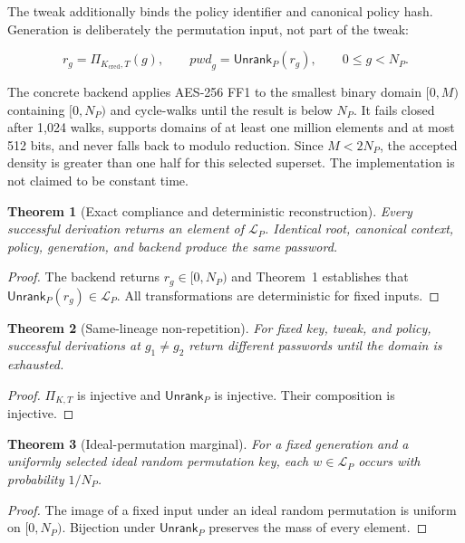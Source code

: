 \documentclass[preprint,12pt]{elsarticle}
\newcommand{\Lang}{\mathcal{L}}
\newcommand{\Unrank}{\mathsf{Unrank}}
\newcommand{\Perm}{\Pi}
\newtheorem{theorem}{Theorem}
\begin{document}
The tweak additionally binds the policy identifier and canonical policy hash.
Generation is deliberately the permutation input, not part of the tweak:

\[
 r_g=\Perm_{K_{\mathrm{cred}},T}(g),\qquad
 \mathit{pwd}_g=\Unrank_P(r_g),\qquad 0\le g<N_P.
\]

The concrete backend applies AES-256 FF1 to the smallest binary domain
$[0,M)$ containing $[0,N_P)$ and cycle-walks until the result is below $N_P$.
It fails closed after 1,024 walks, supports domains of at least one million
elements and at most 512 bits, and never falls back to modulo reduction. Since
$M<2N_P$, the accepted density is greater than one half for this selected
superset. The implementation is not claimed to be constant time.

\begin{theorem}[Exact compliance and deterministic reconstruction]
Every successful derivation returns an element of $\Lang_P$. Identical root,
canonical context, policy, generation, and backend produce the same password.
\end{theorem}

\begin{proof}
The backend returns $r_g\in[0,N_P)$ and Theorem~1 establishes that
$\Unrank_P(r_g)\in\Lang_P$. All transformations are deterministic for fixed
inputs.
\end{proof}

\begin{theorem}[Same-lineage non-repetition]
For fixed key, tweak, and policy, successful derivations at $g_1\ne g_2$ return
different passwords until the domain is exhausted.
\end{theorem}

\begin{proof}
$\Perm_{K,T}$ is injective and $\Unrank_P$ is injective. Their composition is
injective.
\end{proof}

\begin{theorem}[Ideal-permutation marginal]
For a fixed generation and a uniformly selected ideal random permutation key,
each $w\in\Lang_P$ occurs with probability $1/N_P$.
\end{theorem}

\begin{proof}
The image of a fixed input under an ideal random permutation is uniform on
$[0,N_P)$. Bijection under $\Unrank_P$ preserves the mass of every element.
\end{proof}
\end{document}
